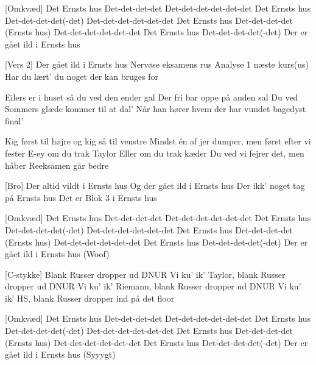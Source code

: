 \documentclass[a4paper,11pt]{article}
\begin{document}
\begin{song}
[Omkvæd] Det Ernsts hus
Det-det-det-det
Det-det-det-det-det-det
Det Ernsts hus
Det-det-det-det(-det)
Det-det-det-det-det-det
Det Ernsts hus
Det-det-det-det (Ernsts hus)
Det-det-det-det-det-det
Det Ernsts hus
Det-det-det-det(-det)
Der er gået ild i Ernsts hus

[Vers 2] Der gået ild i Ernsts hus
Nervøse eksamens rus
Analyse 1 næste kurs(us)
Har du lært’ du noget der kan bruges for

 Eilers er i huset så du ved den ender gal
Der fri bar oppe på anden sal
Du ved Sommers glæde kommer til at dal'
Når han hører hvem der har vundet bagedyst final'

 Kig først til højre og kig så til venstre
Mindst én af jer dumper, men først efter vi fester
E-ey om du trak Taylor
Eller om du trak kæder
Du ved vi fejrer det, men håber
Reeksamen går bedre

[Bro] Der altid vildt i Ernsts hus
 Og der gået ild i Ernsts hus
 Der ikk’ noget tag på Ernsts hus
Det er Blok 3 i Ernsts hus

[Omkvæd] Det Ernsts hus
Det-det-det-det
Det-det-det-det-det-det
Det Ernsts hus
Det-det-det-det(-det)
Det-det-det-det-det-det
Det Ernsts hus
Det-det-det-det (Ernsts hus)
Det-det-det-det-det-det
Det Ernsts hus
Det-det-det-det(-det)
Der er gået ild i Ernsts hus (Woof)

[C-stykke] Blank
Russer dropper ud DNUR
Vi ku’ ik’ Taylor, blank
Russer dropper ud DNUR
Vi ku’ ik’ Riemann, blank
Russer dropper ud DNUR
Vi ku’ ik’ HS, blank
Russer dropper ind på det floor

[Omkvæd] Det Ernsts hus
Det-det-det-det
Det-det-det-det-det-det
Det Ernsts hus
Det-det-det-det(-det)
Det-det-det-det-det-det
Det Ernsts hus
Det-det-det-det (Ernsts hus)
Det-det-det-det-det-det
Det Ernsts hus
Det-det-det-det(-det)
Der er gået ild i Ernsts hus (Syyygt)

\end{song}
\end{document}
